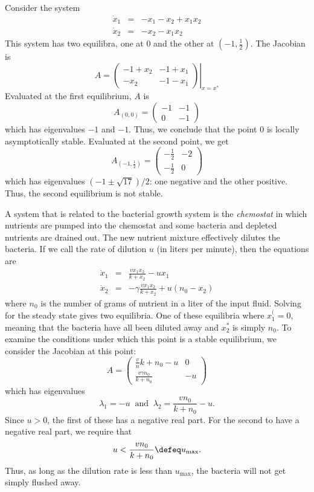 \begin{example}
Consider the system 
%
\begin{eqnarray*}
\dot x_1 & = & -x_1 - x_2 + x_1 x_2 \\
\dot x_2 & = & -x_2 - x_1 x_2
\end{eqnarray*}
%
This system has two equilibra, one at $0$ and the other at
$(-1,\frac{1}{2})$. The Jacobian is
%
$$
A = \left . \left ( \begin{array}{cc}
-1 + x_2 & -1 + x_1 \\
-x_2 & -1 -x_1
\end{array}
\right ) \right |_{x=x^*}
$$
%
Evaluated at the first equilibrium, $A$ is
%
$$
A_{(0,0)} = \left ( \begin{array}{cc}
-1 & -1 \\
0 & -1
\end{array} \right )
$$
%
which has eigenvalues $-1$ and $-1$. Thus, we conclude that the point
$0$ is locally asymptotically stable. Evaluated at the second point, we get
$$
A_{(-1,\frac{1}{2})} = \left ( \begin{array}{cc}
-\frac{1}{2} & -2 \\
-\frac{1}{2} & 0
\end{array} \right )
$$
which has eigenvalues $(-1 \pm \sqrt{17})/2$: one negative and the
other positive. Thus, the second equilibrium is not stable. \enx
\end{example}

\begin{example} \label{ex:chemostat} A system that is related to the
  bacterial growth system is the {\em chemostat} in which nutrients
  are pumped into the chemostat and some bacteria and depleted
  nutrients are drained out. The new nutrient mixture effectively
  dilutes the bacteria. If we call the rate of dilution $u$ (in liters
  per minute), then the equations are
%
\begin{eqnarray}
\dot x_1 & = & \frac{v x_1 x_2}{k+x_2} - u x_1\nonumber  \\
\dot x_2 & = & - \gamma \frac{v x_1 x_2}{k+x_2} + u (n_0 - x_2 ) \label{eqn:chemostat}
\end{eqnarray}
%
where $n_0$ is the number of grams of nutrient in a liter of the input
fluid. Solving for the steady state gives two equilibria. One of these
equilibria where $x_1^(=0$, meaning that the bacteria have all been
diluted away and $x_2^*$ is simply $n_0$. To examine the conditions
under which this point is a stable equilibrium, we consider the
Jacobian at this point:
%
$$
A = \left (
\begin{array}{cc}
\frac{v }n{k+n_0}-u & 0 \\
\frac{v \gamma n_0}{k+n_0} & - u
\end{array}
\right )
$$
which has eigenvalues
$$
\lambda_1 = -u \;\; \mathrm{and} \;\; \lambda_2 = \frac{v n_0}{k+n_0} - u .
$$
%
Since $u>0$, the first of these has a negative real part. For the
second to have a negative real part, we require that
%
$$
u < \frac{v n_0}{k+n_0} \defeq u_\mathrm{max}.
$$
Thus, as long as the dilution rate is less than $u_\mathrm{max}$, the
bacteria will not get simply flushed away. \enx
%
\end{example}

